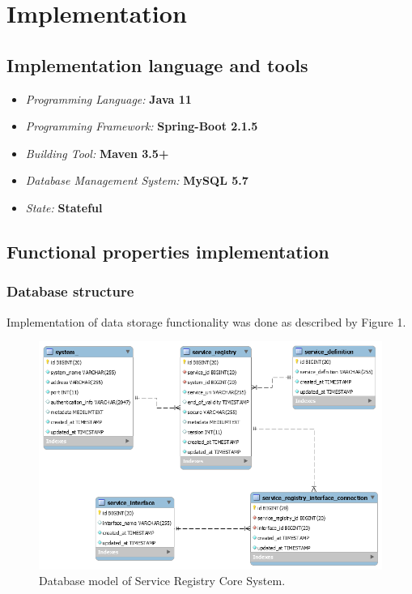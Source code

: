 \documentclass[a4paper]{arrowhead}
\begin{document}
\newpage

\section{Implementation}
\label{sec:implementation}

\subsection {Implementation language and tools}

\begin{itemize}
\item \emph{Programming Language:} \textbf{Java 11}
\item \emph{Programming Framework:} \textbf{Spring-Boot 2.1.5}
\item \emph{Building Tool:} \textbf{Maven 3.5+}
\item \emph{Database Management System:} \textbf{MySQL 5.7}
\item \emph{State:} \textbf{Stateful}
\end{itemize} 

\subsection {Functional properties implementation}

\subsubsection{Database structure}

Implementation of data storage functionality was done as described by Figure 1.

\begin{figure}[h!]
  \centering
  \includegraphics[width=\textwidth]{figures/serviceregistry_database_model}
  \caption{
    Database model of Service Registry Core System.
  }
  \label{fig:model_overview}
\end{figure}
\end{document}
